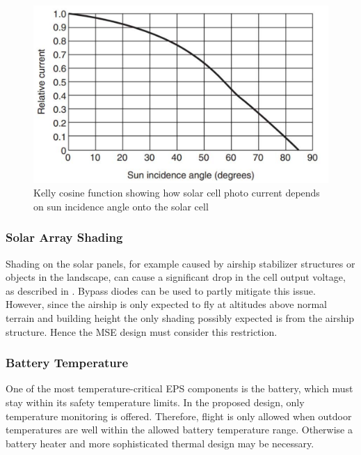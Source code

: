 \begin{figure}[H]
\centering
\includegraphics[scale=0.4]{figures/fig_KellyCosine}
\caption[Kelly cosine function]{Kelly cosine function showing how solar cell photo current depends on sun incidence angle onto the solar cell\cite[Fig 9.12]{book:mukund_wind}}
\label{fig:KellyCosine}
\end{figure}
%
%
\subsubsection*{Solar Array Shading}
Shading on the solar panels, for example caused by airship stabilizer structures or objects in the landscape, can cause a significant drop in the cell output voltage, as described in \cite[p. 165]{Mukund}. Bypass diodes can be used to partly mitigate this issue. However, since the airship is only expected to fly at altitudes above normal terrain and building height the only shading possibly expected is from the airship structure. Hence the \ac{MSE} design must consider this restriction.
%
\subsubsection*{Battery Temperature}
One of the most temperature-critical \ac{EPS} components is the battery, which must stay within its safety temperature limits. In the proposed design, only temperature monitoring is offered. Therefore, flight is only allowed when outdoor temperatures are well within the allowed battery temperature range. Otherwise a battery heater and more sophisticated thermal design may be necessary.
%
